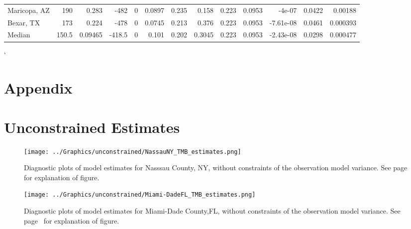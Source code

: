 \documentclass[12pt,letterpaper]{article}
\begin{document}
\begin{sidewaystable}
{\begin{tabular}{lrrrrrrrrrrrr}
 Maricopa, AZ       & 190   & 0.283   & -482   &     0 &          0.0897 &            0.235 &         0.158  &        0.223 &       0.0953 &        -4e-07    &           0.0422  &        0.00188  \\
 Bexar, TX          & 173   & 0.224   & -478   &     0 &          0.0745 &            0.213 &         0.376  &        0.223 &       0.0953 &        -7.61e-08 &           0.0461  &        0.000393 \\
\hline
 Median             & 150.5 & 0.09465 & -418.5 &     0 &          0.101  &            0.202 &         0.3045 &        0.223 &       0.0953 &        -2.43e-08 &           0.0298  &        0.000477 \\
\hline
\end{tabular}


}\end{sidewaystable}

\clearpage
\printbibliography[title=References]
\clearpage
`
\section*{Appendix}
\appendix

\section{Unconstrained Estimates}
\label{app:unconst}


\begin{figure}
\begin{center}
\texttt{[image: ../Graphics/unconstrained/NassauNY\_TMB\_estimates.png]}
\end{center}
\caption{\label{fig:estsNaNYu}
Diagnostic plots of model estimates for Nasssau County, NY, 
without constraints of the observation model variance. 
See page~\pageref{pp:diagexpu} for explanation of figure.
}
\end{figure}

\begin{figure}
\begin{center}
\texttt{[image: ../Graphics/unconstrained/Miami-DadeFL\_TMB\_estimates.png]}
\end{center}
\caption{\label{fig:estsMDFLu}
Diagnostic plots of model estimates for Miami-Dade County,FL,
without constraints of the observation model variance. 
See page~\pageref{pp:diagexpl} for explanation of figure.
}
\end{figure}
\end{document}
